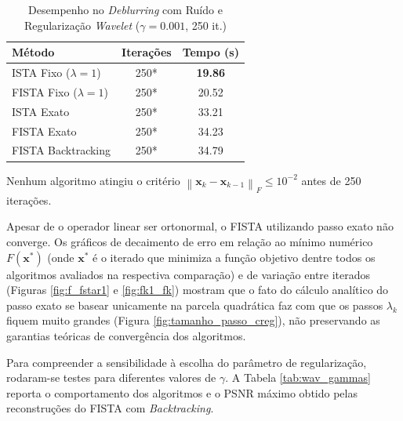 \documentclass[12pt]{article}
\newcommand{\norm}[1]{\left\lVert#1\right\rVert}
\begin{document}
\begin{table}[H]
    \centering
    \caption{Desempenho no \textit{Deblurring} com Ruído e Regularização \textit{Wavelet} ($\gamma=0.001$, 250 it.)}
    \label{tab:wav_deblur_results}
    \begin{tabular}{lcc}
        \toprule
        \textbf{Método} & \textbf{Iterações} & \textbf{Tempo (s)} \\
        \midrule
        ISTA Fixo ($\lambda=1$)     & 250* & \textbf{19.86} \\
        FISTA Fixo ($\lambda=1$)    & 250* & 20.52 \\
        ISTA Exato                  & 250* & 33.21 \\
        FISTA Exato                 & 250* & 34.23 \\
        FISTA Backtracking          & 250* & 34.79 \\
        \bottomrule
    \end{tabular}
    
    \vspace{0.1cm}
    {\footnotesize *Nenhum algoritmo atingiu o critério $\norm{\mathbf{x}_k - \mathbf{x}_{k-1}}_F \le 10^{-2}$ antes de 250 iterações.}
\end{table}

Apesar de o operador linear ser ortonormal, o FISTA utilizando passo exato não converge. Os gráficos de decaimento de erro em relação ao mínimo numérico $F(\mathbf{x}^*)$ (onde $\mathbf{x}^*$ é o iterado que minimiza a função objetivo dentre todos os algoritmos avaliados na respectiva comparação) e de variação entre iterados (Figuras \ref{fig:f_fstar1} e \ref{fig:fk1_fk}) mostram que o fato do cálculo analítico do passo exato se basear unicamente na parcela quadrática faz com que os passos $\lambda_k$ fiquem muito grandes (Figura \ref{fig:tamanho_passo_creg}), não preservando as garantias teóricas de convergência dos algoritmos.

Para compreender a sensibilidade à escolha do parâmetro de regularização, rodaram-se testes para diferentes valores de $\gamma$. A Tabela \ref{tab:wav_gammas} reporta o comportamento dos algoritmos e o PSNR máximo obtido pelas reconstruções do FISTA com \textit{Backtracking}.
\end{document}
